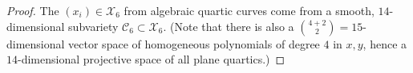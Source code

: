 \documentclass[12pt]{amsart}
\theoremstyle{theorem}
\newcommand{\ZZ}{\mathbb{Z}}
\newcommand{\A}{\mathbb{A}}
\begin{document}
\begin{proof}

%

%
The $(x_i) \in \mathcal{X}_6$ from algebraic quartic curves come from a smooth, $14$-dimensional 
subvariety $\mathcal{C}_6 \subset \mathcal{X}_6$.  (Note that there is also a $\binom{4 + 2}{2} = 15$-dimensional vector space
of homogeneous polynomials of degree $4$ in $x,y$, hence a $14$-dimensional projective space of all plane quartics.)


\end{proof}
\end{document}

